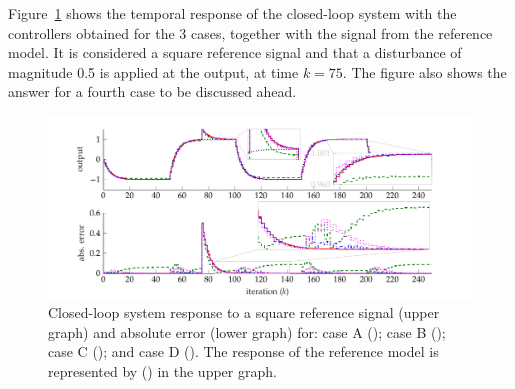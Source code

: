 \begin{exmp}
   Figure~\ref{fig:exp31_time_resp} shows the temporal response of the closed-loop system with the controllers obtained for the 3 cases, together with the signal from the reference model. It is considered a square reference signal and that a disturbance of magnitude 0.5 is applied at the output, at time $k=75$. The figure also shows the answer for a fourth case to be discussed ahead.
   \begin{figure}[htpb]
          
      \footnotesize
      \centering
      \hspace*{-1cm}
      \includegraphics{Figs/ex31_resptemporal.pdf}
      \caption{Closed-loop system response to a square reference signal (upper graph) and absolute error (lower graph) for: case A (); case B (); case C (); and case D (). The response of the reference model is represented by () in the upper graph.}
      \label{fig:exp31_time_resp}
   \end{figure}


\end{exmp}
